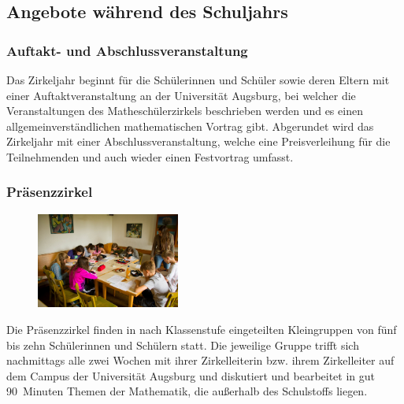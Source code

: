 \documentclass[12pt]{zettel}
\begin{document}
\subsection*{Angebote während des Schuljahrs}

\subsubsection*{Auftakt- und Abschlussveranstaltung}

Das Zirkeljahr beginnt für die Schülerinnen und Schüler sowie deren Eltern mit einer Auftaktveranstaltung an der Universität Augsburg, bei welcher die Veranstaltungen des Matheschülerzirkels beschrieben werden und es einen allgemeinverständlichen mathematischen Vortrag gibt. Abgerundet wird das Zirkeljahr mit einer Abschlussveranstaltung, welche eine Preisverleihung für die Teilnehmenden und auch wieder einen Festvortrag umfasst.

\subsubsection*{Präsenzzirkel}

\begin{figure}
  \vspace{-2.5em}
  \begin{flushleft}
     \includegraphics[width=0.42\textwidth]{impressionen/klein-04}
  \end{flushleft}
  \vspace{-2.2em}
\end{figure}

Die Präsenzzirkel finden in nach Klassenstufe eingeteilten
Kleingruppen von fünf bis zehn Schülerinnen und Schülern statt.
Die jeweilige Gruppe trifft sich nachmittags alle zwei Wochen mit ihrer Zirkelleiterin bzw. ihrem Zirkelleiter auf dem Campus der Universität Augsburg und diskutiert und
bearbeitet in gut 90~Minuten Themen der Mathematik, die außerhalb des
Schulstoffs liegen.
\end{document}

